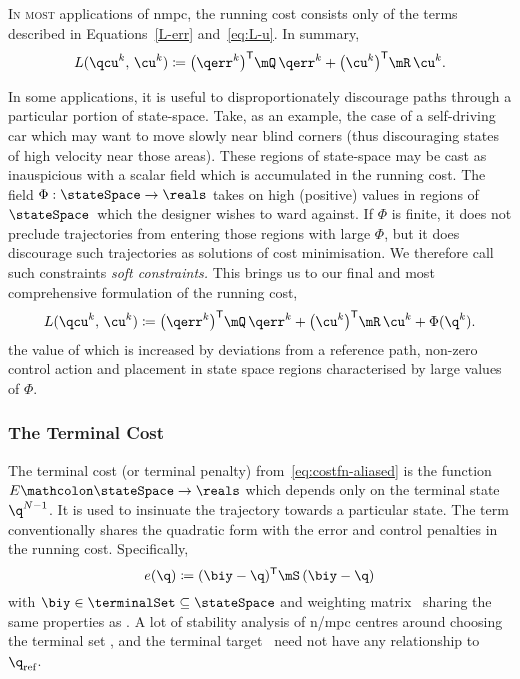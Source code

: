 \textsc{In most} applications of \ac{nmpc}, the running cost consists only of the terms described in Equations~\eqref{L-err} and~\eqref{eq:L-u}. In summary,
%
\begin{equation}\label{L-err-u}
  L(\qcu^k,\,\cu^k) \coloneq \bigl(\qerr^k\bigr)\tr\mQ\,\qerr^k + \bigl(\cu^k\bigr)\tr\mR\,\cu^k.
\end{equation}

In some applications, it is useful to disproportionately discourage paths
through a particular portion of state-space. Take, as an example, the case of a
self-driving car which may want to move slowly near blind corners (thus
discouraging states of high velocity near those areas). These regions of
state-space may be cast as inauspicious with a scalar field which is accumulated in
the running cost. The field $\Phi:\stateSpace\rightarrow\reals$ takes on high (positive) values in regions of
$\stateSpace$\ which the designer wishes to ward against. If $\Phi$ is finite,
it does not preclude trajectories from entering those regions with large $\Phi$,
but it does discourage such trajectories as solutions of cost minimisation. We
therefore call such constraints \emph{soft constraints.}
This brings us to our final and most comprehensive formulation of the running
cost,
%
\begin{equation}\label{eq:L-err-u-Phi}
  L(\qcu^k,\,\cu^k) \coloneq \bigl(\qerr^k\bigr)\tr\mQ\,\qerr^k + \bigl(\cu^k\bigr)\tr\mR\,\cu^k + \Phi(\q^k).
\end{equation}
%
the value of which is increased by deviations from a reference path, non-zero
control action and placement in state space regions characterised by large
values of $\Phi$.



\subsubsection{The Terminal Cost}%


The terminal cost (or terminal penalty) from~\eqref{eq:costfn-aliased} is the
function $E\mathcolon\stateSpace\rightarrow\reals$ which depends only on the
terminal state $\q^{N-1}$. It is used to insinuate the trajectory towards a
particular state. The term conventionally shares the quadratic form with the
error and control penalties in the running cost. Specifically,
%
\begin{equation}\label{eq:terminal-cost}
  e(\q) \coloneq (\biy-\q)\tr\mS\,(\biy-\q)
\end{equation}
%
with  $\biy\in\terminalSet\subseteq\stateSpace$ and weighting matrix \mS\
sharing the same properties as \mQ. A lot of stability analysis of \ac{n/mpc}
centres around choosing the terminal set \terminalSet, and the terminal target
\biy\ need not have any relationship to $\q\rnc$.

